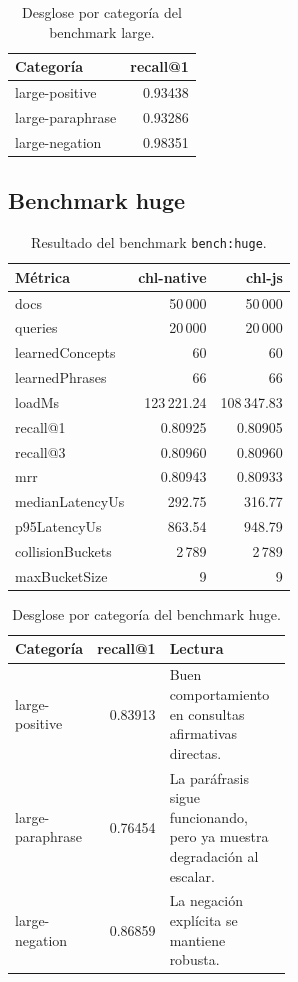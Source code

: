 \documentclass[11pt]{article}
\begin{document}
\begin{table}[h]
\centering
\small
\begin{tabular}{lr}
\toprule
\textbf{Categoría} & \textbf{recall@1} \\
\midrule
large-positive & 0.93438 \\
large-paraphrase & 0.93286 \\
large-negation & 0.98351 \\
\bottomrule
\end{tabular}
\caption{Desglose por categoría del benchmark large.}
\end{table}

\subsection{Benchmark huge}

\begin{table}[h]
\centering
\small
\begin{tabular}{lrr}
\toprule
\textbf{Métrica} & \textbf{chl-native} & \textbf{chl-js} \\
\midrule
docs & 50\,000 & 50\,000 \\
queries & 20\,000 & 20\,000 \\
learnedConcepts & 60 & 60 \\
learnedPhrases & 66 & 66 \\
loadMs & 123\,221.24 & 108\,347.83 \\
recall@1 & 0.80925 & 0.80905 \\
recall@3 & 0.80960 & 0.80960 \\
mrr & 0.80943 & 0.80933 \\
medianLatencyUs & 292.75 & 316.77 \\
p95LatencyUs & 863.54 & 948.79 \\
collisionBuckets & 2\,789 & 2\,789 \\
maxBucketSize & 9 & 9 \\
\bottomrule
\end{tabular}
\caption{Resultado del benchmark \texttt{bench:huge}.}
\end{table}

\begin{table}[h]
\centering
\small
\begin{tabular}{lrp{0.55\linewidth}}
\toprule
\textbf{Categoría} & \textbf{recall@1} & \textbf{Lectura} \\
\midrule
large-positive & 0.83913 & Buen comportamiento en consultas afirmativas directas. \\
large-paraphrase & 0.76454 & La paráfrasis sigue funcionando, pero ya muestra degradación al escalar. \\
large-negation & 0.86859 & La negación explícita se mantiene robusta. \\
\bottomrule
\end{tabular}
\caption{Desglose por categoría del benchmark huge.}
\end{table}
\end{document}
